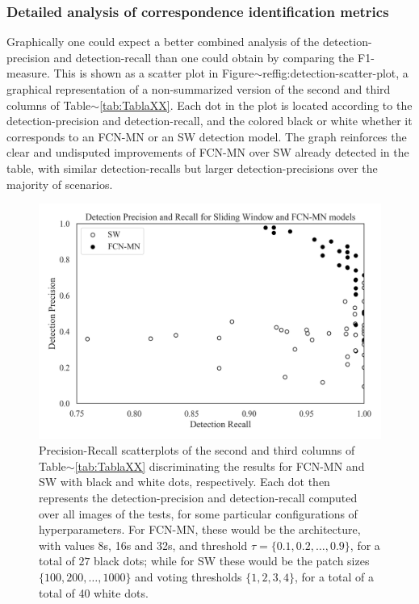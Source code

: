 \documentclass[a4paper,authoryear,review]{elsarticle}
\begin{document}
	\subsubsection{Detailed analysis of correspondence identification metrics} 
	\label{sub:compFCNSW}
	
	
	Graphically one could expect a better combined analysis of the detection-precision and detection-recall than one could obtain by comparing the F1-measure. This is shown as a scatter plot in Figure$\sim$ref{fig:detection-scatter-plot}, a graphical representation of a non-summarized version of the second and third columns of Table$\sim$\ref{tab:TablaXX}. Each dot  in the plot is located according to the detection-precision and detection-recall, and the colored black or white whether it corresponds to an FCN-MN or an SW detection model.
	The graph reinforces the clear and undisputed improvements of FCN-MN over SW already detected in the table, with similar detection-recalls but larger detection-precisions over the majority of scenarios. 
	
	
	
	
	\begin{figure}
		\centering
		\includegraphics[width=\textwidth]{figures/111_precision_recall_detection.png}
		\caption{Precision-Recall scatterplots of the second and third columns of Table$\sim$\ref{tab:TablaXX} discriminating the results for FCN-MN and SW with black and white dots, respectively. Each dot then  represents the detection-precision and detection-recall computed over all images of the tests, for some particular  configurations of hyperparameters. For FCN-MN, these would be the architecture, with values 8s, 16s and 32s, and threshold $\tau = \{0.1, 0.2, \ldots, 0.9\}$,  for a total of $27$ black dots; while for SW these would be the patch sizes  $\{100, 200, \ldots, 1000\}$ and voting thresholds $\{1, 2, 3, 4\}$, for a total of a total of 40 white dots.}
		\label{fig:detection-scatter-plot}
	\end{figure}
	
\end{document}
